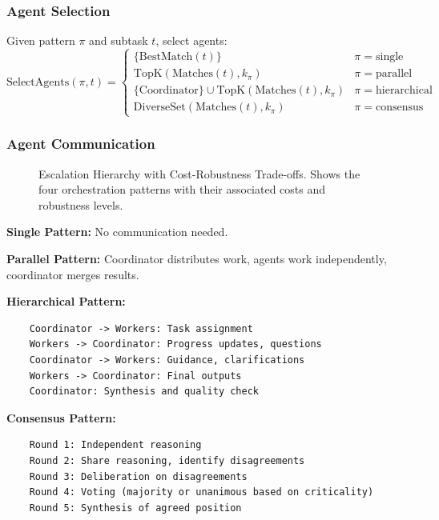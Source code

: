 \documentclass{article}
\theoremstyle{plain}
\theoremstyle{definition}
\theoremstyle{remark}
\begin{document}
\subsubsection{Agent Selection}

Given pattern $\pi$ and subtask $t$, select agents:
\begin{equation}
	\text{SelectAgents}(\pi, t) = \begin{cases}
		\{\text{BestMatch}(t)\} & \pi = \text{single} \\
		\text{TopK}(\text{Matches}(t), k_\pi) & \pi = \text{parallel} \\
		\{\text{Coordinator}\} \cup \text{TopK}(\text{Matches}(t), k_\pi) & \pi = \text{hierarchical} \\
		\text{DiverseSet}(\text{Matches}(t), k_\pi) & \pi = \text{consensus}
	\end{cases}
\end{equation}

\subsubsection{Agent Communication}

\begin{figure}[t]
	\centering
	
	\caption{Escalation Hierarchy with Cost-Robustness Trade-offs. Shows the four orchestration patterns with their associated costs and robustness levels.}
	\label{fig:framework2}
\end{figure}

\textbf{Single Pattern:} No communication needed.

\textbf{Parallel Pattern:} Coordinator distributes work, agents work independently, coordinator merges results.

\textbf{Hierarchical Pattern:}
\begin{verbatim}
	Coordinator -> Workers: Task assignment
	Workers -> Coordinator: Progress updates, questions
	Coordinator -> Workers: Guidance, clarifications
	Workers -> Coordinator: Final outputs
	Coordinator: Synthesis and quality check
\end{verbatim}

\textbf{Consensus Pattern:}
\begin{verbatim}
	Round 1: Independent reasoning
	Round 2: Share reasoning, identify disagreements
	Round 3: Deliberation on disagreements
	Round 4: Voting (majority or unanimous based on criticality)
	Round 5: Synthesis of agreed position
\end{verbatim}
\end{document}
